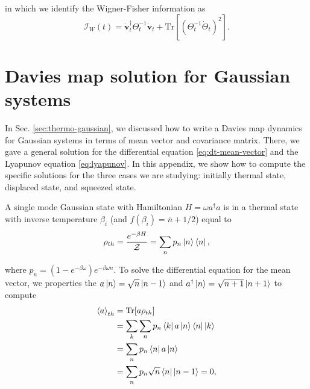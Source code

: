\begin{apendicesenv}
\noindent in which we identify the Wigner-Fisher information as
\begin{equation}
    \mathcal{I}_W (t) = \dot{\mathbf{v}}_t^\dagger \Theta^{-1}_t \dot{\mathbf{v}}_t + \text{Tr}[(\Theta_t^{-1} \dot{\Theta}_t)^2].
\end{equation}







\chapter{Davies map solution for Gaussian systems}
\label{apx:lyapunov}


In Sec. \ref{sec:thermo-gaussian}, we discussed how to write a Davies map dynamics for Gaussian systems in terms of mean vector and covariance matrix. There, we gave a general solution for the differential equation \eqref{eq:dt-mean-vector} and the Lyapunov equation \eqref{eq:lyapunov}. In this appendix, we show how to compute the specific solutions for the three cases we are studying: initially thermal state, displaced state, and squeezed state.

A single mode Gaussian state with Hamiltonian $H = \omega a^\dagger a$ is in a thermal state with inverse temperature $\beta_i$ (and $f(\beta_i) = \bar{n} + 1/2$) equal to
\begin{equation}
	\rho_{th} = \frac{e^{-\beta H}}{\mathcal{Z}} = \sum_n p_n \ket{n}\bra{n},
\end{equation}

\noindent where $p_n = (1- e^{-\beta \omega}) e^{-\beta \omega n}$. To solve the differential equation for the mean vector, we properties the $a \ket{n} = \sqrt{n} \ket{n-1}$ and $a^\dagger \ket{n} = \sqrt{n+1} \ket{n+1}$ to compute
\begin{equation}
	\begin{split}
		\braket{a}_{th} &= \text{Tr} [a \rho_{th}]\\
		&= \sum_k \sum_n p_n \bra{k} a \ket{n} \bra{n} \ket{k}\\
		&= \sum_n p_n \bra{n} a \ket{n}\\
		& = \sum_n p_n \sqrt{n} \bra{n}\ket{n-1} = 0,
	\end{split}
\end{equation}


\end{apendicesenv}

